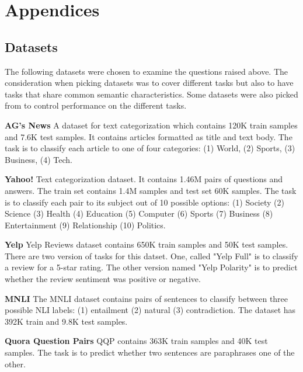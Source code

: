 \documentclass[11pt,a4paper]{article}
\begin{document}
\appendix


\section{Appendices}
\label{sec:appendix}

\subsection{Datasets}
\label{apx:datasets}
The following datasets were chosen to examine the questions raised above.
The consideration when picking datasets was to cover different tasks but also to have tasks that share common semantic characteristics. 
Some datasets were also picked from \citet{schick2020exploiting} to control performance on the different tasks.

\vspace{8pt}
\noindent \textbf{AG's News} \quad
A dataset for text categorization which contains 120K train samples and 7.6K test samples.
It contains articles formatted as title and text body.
The task is to classify each article to one of four categories: (1) World, (2) Sports, (3) Business, (4) Tech.

\vspace{8pt}
\noindent \textbf{Yahoo!} \quad
Text categorization dataset. It contains 1.46M pairs of questions and answers.
The train set contains 1.4M samples and test set 60K samples.
The task is to classify each pair to its subject out of 10 possible options: (1) Society (2) Science (3) Health (4) Education (5) Computer (6) Sports (7) Business (8) Entertainment (9) Relationship (10) Politics.

\vspace{8pt}
\noindent \textbf{Yelp} \quad
Yelp Reviews dataset contains 650K train samples and 50K test samples.
There are two version of tasks for this datset.
One, called "Yelp Full" is to classify a review for a 5-star rating.
The other version named "Yelp Polarity" is to predict whether the review sentiment was positive or negative.

\vspace{8pt}
\noindent \textbf{MNLI} \quad
The MNLI dataset contains pairs of sentences to classify between three possible NLI labels: (1) entailment (2) natural (3) contradiction. 
The dataset has 392K train and 9.8K test samples.

\vspace{8pt}
\noindent \textbf{Quora Question Pairs} \quad
QQP contains 363K train samples and 40K test samples.
The task is to predict whether two sentences are paraphrases one of the other.
\end{document}

